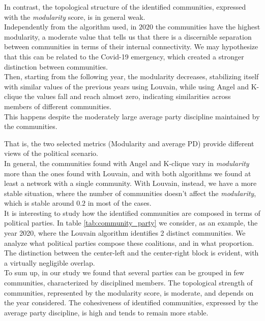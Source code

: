 In contrast, the topological structure of the identified communities, expressed with the \textit{modularity} score, is in general weak.\\ Independently from the algorithm used, in $2020$ the communities have the highest modularity, a moderate value that tells us that there is a discernible separation between communities in terms of their internal connectivity. We may hypothesize that this can be related to the Covid-19 emergency, which created a stronger distinction between communities.\\
Then, starting from the following year, the modularity decreases, stabilizing itself with similar values of the previous years using Louvain, while using Angel and K-clique the values fall and reach almost zero, indicating similarities across members of different communities.\\
This happens despite the moderately large average party discipline maintained by the communities. 

That is, the two selected metrics (Modularity and average PD) provide different views of the political scenario.\\



In general, the communities found with Angel and K-clique vary in \textit{modularity} more than the ones found with Louvain, and with both algorithms we found at least a network with a single community. With Louvain, instead, we have a more stable situation, where the number of communities doesn't affect the \textit{modularity}, which is stable around $0.2$ in most of the cases.\\

It is interesting to study how the identified communities are composed in terms of political parties. In table \ref{tab:community_party} we consider, as an example, the year 2020, where the Louvain algorithm identifies 2 distinct communities. We analyze what political parties compose these coalitions, and in what proportion.\\
The distinction between the center-left and the center-right block is evident, with a virtually negligible overlap.\\ 

To sum up, in our study we found that several parties can be grouped in few communities, characterized by disciplined members. The topological strength of communities, represented by the modularity score, is moderate, and depends on the year considered. The cohesiveness of identified communities, expressed by the average party discipline, is high and tends to remain more stable.


